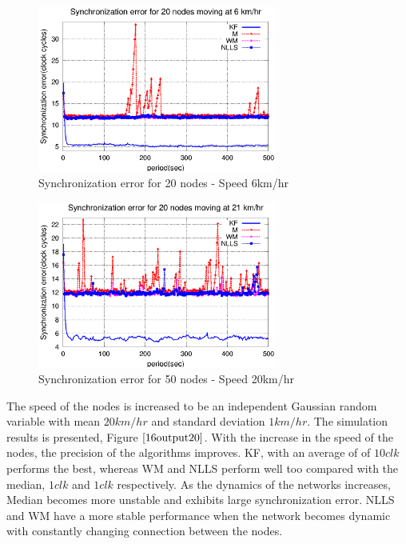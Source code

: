 \documentclass[a4paper,10pt]{report}
\begin{document}
\paragraph*{}
\begin{figure}
\centering
\includegraphics[width=0.7\textwidth]{16output-s6}
\caption{Synchronization error for 20 nodes - Speed 6km/hr} \label{16output6}
\end{figure}
\begin{figure}
\centering
\includegraphics[width=0.7\textwidth]{16output-s20}
\caption{Synchronization error for 50 nodes - Speed 20km/hr}
\label{16output20}
\end{figure}
The speed of the nodes is increased to be an independent Gaussian random variable with mean $20km/hr$ and standard deviation $1km/hr$. The simulation results is presented, Figure $\ref{16output20}$. With the increase in the speed of the nodes, the precision of the algorithms improves. KF, with an average of of $10 clk$ performs the best, whereas WM and NLLS perform well too compared with the median, $1 clk$ and $1 clk$ respectively. As the dynamics of the networks increases, Median becomes more unstable and exhibits large synchronization error. NLLS and WM have a more stable performance when the network becomes dynamic with constantly changing connection between the nodes.
\end{document}

